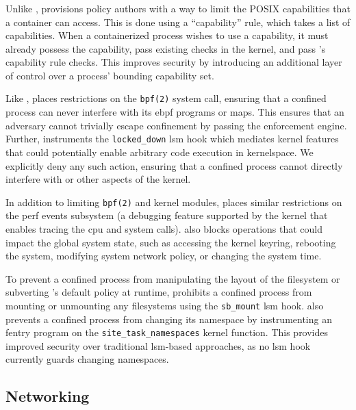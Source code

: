 \subsubsection{\bpfcontain{}}

Unlike \bpfbox{}, \bpfcontain{} provisions policy authors with a way to limit the POSIX
capabilities that a container can access. This is done using a \enquote{capability} rule,
which takes a list of capabilities. When a containerized process wishes to use
a capability, it must already possess the capability, pass existing checks in the kernel,
and pass \bpfcontain{}'s capability rule checks. This improves security by introducing an
additional layer of control over a process' bounding capability set.

Like \bpfbox{}, \bpfcontain{} places restrictions on the \texttt{bpf(2)} system call,
ensuring that a confined process can never interfere with its \gls{ebpf} programs or maps.
This ensures that an adversary cannot trivially escape confinement by passing the
enforcement engine. Further, \bpfcontain{} instruments the \texttt{locked\_down} \gls{lsm}
hook which mediates kernel features that could potentially enable arbitrary code execution
in kernelspace.  We explicitly deny any such action, ensuring that a confined process
cannot directly interfere with \bpfcontain{} or other aspects of the kernel.

In addition to limiting \texttt{bpf(2)} and kernel modules, \bpfcontain{} places similar
restrictions on the perf events subsystem (a debugging feature supported by the kernel
that enables tracing the \gls{cpu} and system calls). \bpfcontain{} also blocks operations
that could impact the global system state, such as accessing the kernel keyring, rebooting
the system, modifying system network policy, or changing the system time.

To prevent a confined process from manipulating the layout of the filesystem or subverting
\bpfcontain{}'s default policy at runtime, \bpfcontain{} prohibits a confined process from
mounting or unmounting any filesystems using the \texttt{sb\_mount} \gls{lsm} hook.
\bpfcontain{} also prevents a confined process from changing its namespace by
instrumenting an fentry program on the \texttt{site\_task\_namespaces} kernel function.
This provides improved security over traditional \gls{lsm}-based approaches, as no
\gls{lsm} hook currently guards changing namespaces.

\subsection{Networking}


